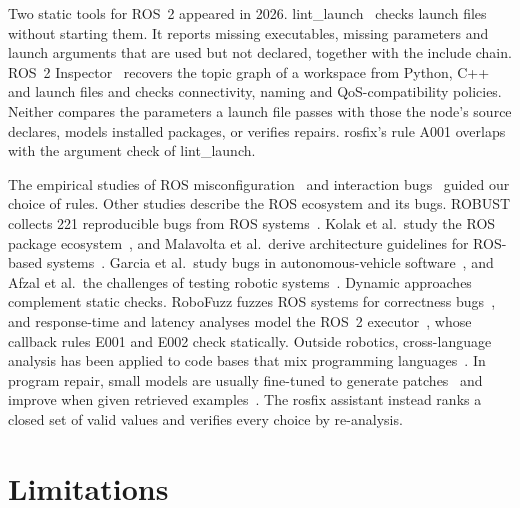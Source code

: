 \documentclass[conference]{IEEEtran}
\begin{document}
Two static tools for ROS~2 appeared in 2026. lint\_launch~\cite{lintlaunch} checks launch files
without starting them. It reports missing executables, missing parameters and launch arguments
that are used but not declared, together with the include chain. ROS~2
Inspector~\cite{ros2inspector} recovers the topic graph of a workspace from Python, C++ and launch
files and checks connectivity, naming and QoS-compatibility policies. Neither compares the
parameters a launch file passes with those the node's source declares, models installed packages,
or verifies repairs. rosfix's rule A001 overlaps with the argument check of lint\_launch.

The empirical studies of ROS misconfiguration~\cite{canelas2024misconfig} and interaction
bugs~\cite{chen2025ibugs} guided our choice of rules. Other studies describe the ROS ecosystem and
its bugs. ROBUST collects 221 reproducible bugs from ROS systems~\cite{timperley2024robust}. Kolak
et al.\ study the ROS package ecosystem~\cite{kolak2020village}, and Malavolta et al.\ derive
architecture guidelines for ROS-based systems~\cite{malavolta2020architect}. Garcia et al.\ study
bugs in autonomous-vehicle software~\cite{garcia2020avbugs}, and Afzal et al.\ the challenges of
testing robotic systems~\cite{afzal2020testing}. Dynamic approaches complement static checks.
RoboFuzz fuzzes ROS systems for correctness bugs~\cite{kim2022robofuzz}, and response-time and
latency analyses model the ROS~2 executor~\cite{casini2019response,kronauer2021latency}, whose
callback rules E001 and E002 check statically. Outside robotics, cross-language analysis has been
applied to code bases that mix programming languages~\cite{mayer2012cross}. In program repair, small models are usually
fine-tuned to generate patches~\cite{silva2023repairllama} and improve when given retrieved
examples~\cite{wang2023rapgen}. The rosfix assistant instead ranks a closed set of valid values
and verifies every choice by re-analysis.

\section{Limitations}
\end{document}
